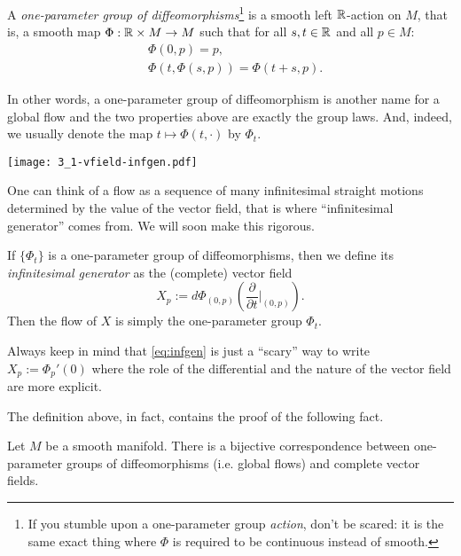 \begin{definition}
  A \emph{one-parameter group of diffeomorphisms}\footnote{If you stumble upon a one-parameter group \emph{action}, don't be scared: it is the same exact thing where $\Phi$ is required to be continuous instead of smooth.} is a smooth left $\mathbb{R}$-action on $M$, that is, a smooth map $\Phi:\mathbb{R}\times M \to M$ such that for all $s,t\in\mathbb{R}$ and all $p\in M$:
  \begin{align}
    &\Phi(0,p) = p,\\
    &\Phi(t, \Phi(s, p)) = \Phi(t+s, p).
  \end{align}
  
  In other words, a one-parameter group of diffeomorphism is another name for a global flow and the two properties above are exactly the group laws.
  And, indeed, we usually denote the map $t\mapsto\Phi(t,\cdot)$ by $\Phi_t$.

  \begin{marginfigure}
    \texttt{[image: 3\_1-vfield-infgen.pdf]}
    \label{fig:3_1-vfield-infgen}
    \caption{One can think of a flow as a sequence of many infinitesimal straight motions determined by the value of the vector field, that is where ``infinitesimal generator'' comes from. We will soon make this rigorous.}
  \end{marginfigure}
  If $\{\Phi_t\}$ is a one-parameter group of diffeomorphisms, then we define its \emph{infinitesimal generator} as the (complete) vector field
  \begin{equation}\label{eq:infgen}
    X_p := d\Phi_{(0,p)}\left(\frac{\partial}{\partial t}\Big|_{(0,p)}\right).
  \end{equation}
  Then the flow of $X$ is simply the one-parameter group $\Phi_t$.

  Always keep in mind that \eqref{eq:infgen} is just a ``scary'' way to write $X_p := \Phi_p'(0)$ where the role of the differential and the nature of the vector field are more explicit.
\end{definition}

The definition above, in fact, contains the proof of the following fact.
\begin{proposition}
  Let $M$ be a smooth manifold. There is a bijective correspondence between one-parameter groups of diffeomorphisms (i.e. global flows) and complete vector fields.
\end{proposition}


